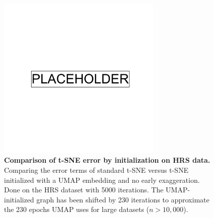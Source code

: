 \begin{figure}[!htb]
    \centering
    \includegraphics[width=0.7\textwidth]{placeholder.png}
    \caption[Comparison of t-SNE error by initialization on HRS data]{\textbf{Comparison of t-SNE error by initialization on HRS data.} Comparing the error terms of standard t-SNE versus t-SNE initialized with a UMAP embedding and no early exaggeration. Done on the HRS dataset with 5000 iterations. The UMAP-initialized graph has been shifted by 230 iterations to approximate the 230 epochs UMAP uses for large datasets ($n>10,000$).}
    \label{fig:supp_tsne_umap_compare_hrs_graph}
\end{figure}

\newpage

